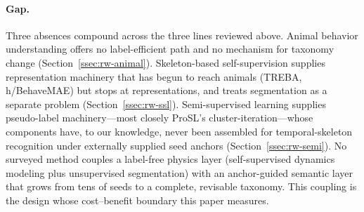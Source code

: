 \paragraph{Gap.}
Three absences compound across the three lines reviewed above. Animal behavior understanding offers no label-efficient path and no mechanism for taxonomy change (Section~\ref{ssec:rw-animal}). Skeleton-based self-supervision supplies representation machinery that has begun to reach animals (TREBA, h/BehaveMAE) but stops at representations, and treats segmentation as a separate problem (Section~\ref{ssec:rw-ssl}). Semi-supervised learning supplies pseudo-label machinery---most closely ProSL's cluster-iteration---whose components have, to our knowledge, never been assembled for temporal-skeleton recognition under externally supplied seed anchors (Section~\ref{ssec:rw-semi}). No surveyed method couples a label-free physics layer (self-supervised dynamics modeling plus unsupervised segmentation) with an anchor-guided semantic layer that grows from tens of seeds to a complete, revisable taxonomy. This coupling is the design whose cost--benefit boundary this paper measures.
